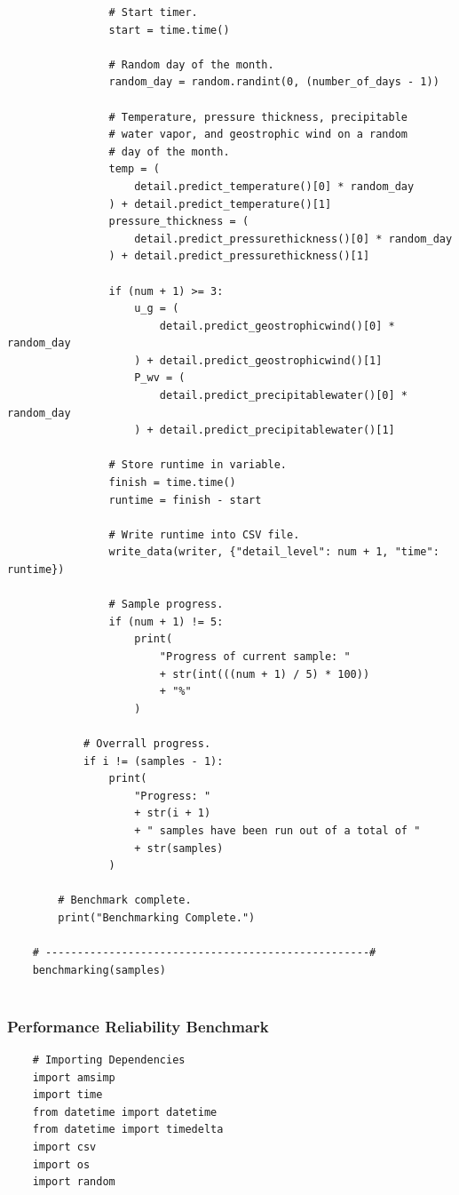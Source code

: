 \begin{appendices}
\begin{verbatim}
                # Start timer.
                start = time.time()
    
                # Random day of the month.
                random_day = random.randint(0, (number_of_days - 1))
    
                # Temperature, pressure thickness, precipitable 
                # water vapor, and geostrophic wind on a random
                # day of the month.
                temp = (
                    detail.predict_temperature()[0] * random_day
                ) + detail.predict_temperature()[1]
                pressure_thickness = (
                    detail.predict_pressurethickness()[0] * random_day
                ) + detail.predict_pressurethickness()[1]
    
                if (num + 1) >= 3:
                    u_g = (
                        detail.predict_geostrophicwind()[0] * random_day
                    ) + detail.predict_geostrophicwind()[1]
                    P_wv = (
                        detail.predict_precipitablewater()[0] * random_day
                    ) + detail.predict_precipitablewater()[1]
    
                # Store runtime in variable.
                finish = time.time()
                runtime = finish - start
    
                # Write runtime into CSV file.
                write_data(writer, {"detail_level": num + 1, "time": runtime})
    
                # Sample progress.
                if (num + 1) != 5:
                    print(
                        "Progress of current sample: "
                        + str(int(((num + 1) / 5) * 100))
                        + "%"
                    )
    
            # Overrall progress.
            if i != (samples - 1):
                print(
                    "Progress: "
                    + str(i + 1)
                    + " samples have been run out of a total of "
                    + str(samples)
                )
    
        # Benchmark complete.
        print("Benchmarking Complete.")
    
    # ---------------------------------------------------#
    benchmarking(samples)
    
    \end{verbatim}
    
    \subsubsection{Performance Reliability Benchmark}
    \begin{verbatim}
    # Importing Dependencies
    import amsimp
    import time
    from datetime import datetime
    from datetime import timedelta
    import csv
    import os
    import random
    

\end{verbatim}
\end{appendices}
